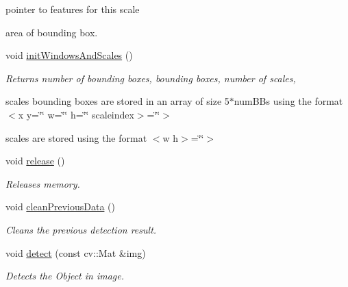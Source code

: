 \begin{DoxyCompactItemize}
\begin{DoxyCompactList}
 pointer to features for this scale \par
 area of bounding box. \end{DoxyCompactList}\item 
void \hyperlink{classtld_1_1DetectorCascade_a0515043558291c0bfbd5d403315c0334}{init\-Windows\-And\-Scales} ()
\begin{DoxyCompactList}\small\item\em Returns number of bounding boxes, bounding boxes, number of scales, \par
 scales bounding boxes are stored in an array of size 5$\ast$num\-B\-Bs using the format $<$x y=\char`\"{}\char`\"{} w=\char`\"{}\char`\"{} h=\char`\"{}\char`\"{} scaleindex$>$=\char`\"{}\char`\"{}$>$ \par
 scales are stored using the format $<$w h$>$=\char`\"{}\char`\"{}$>$ \end{DoxyCompactList}\item 
void \hyperlink{classtld_1_1DetectorCascade_a4658f60cc03595d55920b4949ff26a69}{release} ()
\begin{DoxyCompactList}\small\item\em Releases memory. \end{DoxyCompactList}\item 
void \hyperlink{classtld_1_1DetectorCascade_a56b148b63e2c592624c90bc7f7f50d68}{clean\-Previous\-Data} ()
\begin{DoxyCompactList}\small\item\em Cleans the previous detection result. \end{DoxyCompactList}\item 
void \hyperlink{classtld_1_1DetectorCascade_a4ec511b5488bd1a1dc241e6dac191165}{detect} (const cv\-::\-Mat \&img)
\begin{DoxyCompactList}\small\item\em Detects the Object in image. \end{DoxyCompactList}\end{DoxyCompactItemize}
